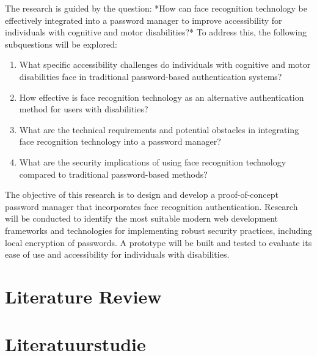 The research is guided by the question: *How can face recognition technology be effectively integrated into a password manager to improve accessibility for individuals with cognitive and motor disabilities?* To address this, the following subquestions will be explored:

\begin{enumerate}
\item What specific accessibility challenges do individuals with cognitive and motor disabilities face in traditional password-based authentication systems?
\item How effective is face recognition technology as an alternative authentication method for users with disabilities?
\item What are the technical requirements and potential obstacles in integrating face recognition technology into a password manager?
\item What are the security implications of using face recognition technology compared to traditional password-based methods?
\end{enumerate}

The objective of this research is to design and develop a proof-of-concept password manager that incorporates face recognition authentication. Research will be conducted to identify the most suitable modern web development frameworks and technologies for implementing robust security practices, including local encryption of passwords. A prototype will be built and tested to evaluate its ease of use and accessibility for individuals with disabilities.\section{Literature Review}%

\vspace{2\baselineskip}

\section{Literatuurstudie}%
\label{sec:literature review}

